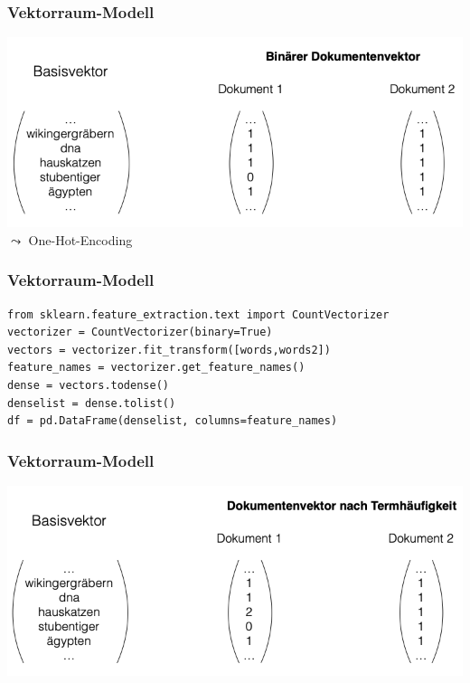     
\begin{frame}
    \frametitle{Vektorraum-Modell}
    \vspace{1.5cm}
    \includegraphics[width=\linewidth]{fig8/binaervektor}
    $\leadsto$ One-Hot-Encoding
\end{frame}
    
    
\begin{frame}[fragile]
    \frametitle{Vektorraum-Modell}
    
    \begin{verbatim}
from sklearn.feature_extraction.text import CountVectorizer
vectorizer = CountVectorizer(binary=True)
vectors = vectorizer.fit_transform([words,words2])
feature_names = vectorizer.get_feature_names()
dense = vectors.todense()
denselist = dense.tolist()
df = pd.DataFrame(denselist, columns=feature_names)
    \end{verbatim}
\end{frame}
      
    
\begin{frame}
    \frametitle{Vektorraum-Modell}
    \vspace{1.5cm}
    \includegraphics[width=\linewidth]{fig8/tfvektor}
    
\end{frame}


